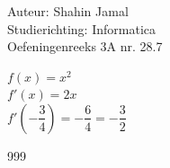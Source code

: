 \documentclass[a4paper]{article}
\begin{document}
  
\noindent \large Auteur: Shahin Jamal \\
\noindent \large Studierichting: Informatica\\
\noindent \large Oefeningenreeks 3A nr. 28.7\\

\medskip

\normalsize

$f(x) = x^2$\\

$f'(x) = 2x$\\

$f'\left(-\dfrac{3}{4}\right)=-\dfrac{6}{4} = -\dfrac{3}{2}$\\

\begin{thebibliography}{999}
\end{thebibliography}
\end{document}
